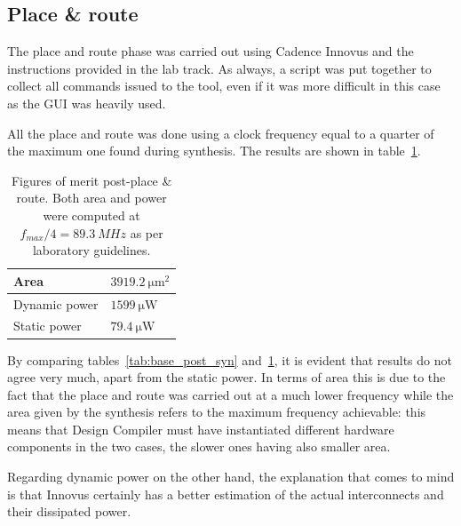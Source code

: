 \documentclass[a4paper]{article}
\begin{document}
\subsection{Place \& route}
The place and route phase was carried out using Cadence Innovus and the instructions provided in the lab track. As always, a script was put together to collect all commands issued to the tool, even if it was more difficult in this case as the GUI was heavily used. 

All the place and route was done using a clock frequency equal to a quarter of the maximum one found during synthesis. The results are shown in table~\ref{tab:base_post_pnr}.

\begin{table}[hbtp]
    \centering
    \begin{tabular}{|l|l|}
    \hline
    Area          & $\SI{3919.2}{\micro\meter^2}$   \\ \hline
    Dynamic power & $\SI{1599}{\micro\watt}$        \\ \hline
    Static power  & $\SI{79.4}{\micro\watt}$        \\ \hline
    \end{tabular}
    \caption{Figures of merit post-place \& route. Both area and power were computed at $f_{max}/4 = \SI{89.3}{MHz}$ as per laboratory guidelines.}
    \label{tab:base_post_pnr}
\end{table}

By comparing tables~\ref{tab:base_post_syn} and~\ref{tab:base_post_pnr}, it is evident that results do not agree very much, apart from the static power. In terms of area this is due to the fact that the place and route was carried out at a much lower frequency while the area given by the synthesis refers to the maximum frequency achievable: this means that Design Compiler must have instantiated different hardware components in the two cases, the slower ones having also smaller area. 

Regarding dynamic power on the other hand, the explanation that comes to mind is that Innovus certainly has a better estimation of the actual interconnects and their dissipated power.
\end{document}
